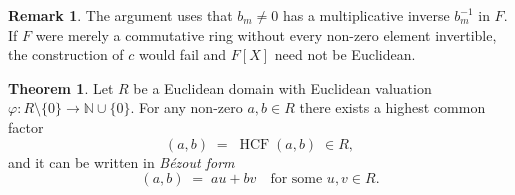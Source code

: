 \documentclass[12pt]{article}
\theoremstyle{definition} %
\newtheorem{theorem}{Theorem}
\newtheorem{remark}{Remark}
\theoremstyle{plain} %
\begin{document}
  \begin{remark}
  The argument uses that \(b_m\neq0\) has a multiplicative inverse
  \(b_m^{-1}\) in \(F\).  If \(F\) were merely a commutative ring without
  every non-zero element invertible, the construction of \(c\) would fail
  and \(F[X]\) need not be Euclidean.
  \end{remark}
\begin{theorem}
  Let \(R\) be a Euclidean domain with Euclidean valuation
  \(\varphi : R\setminus\{0\}\to\mathbb N\cup\{0\}\).
  For any non-zero \(a,b\in R\) there exists a highest common factor
  \[
     (a,b)\;=\;\operatorname{HCF}(a,b)\;\in R,
  \]
  and it can be written in \emph{Bézout form}
  \[
     (a,b)\;=\;au + bv
     \quad\text{for some }u,v\in R .
  \]
  \end{theorem}
  
\end{document}
